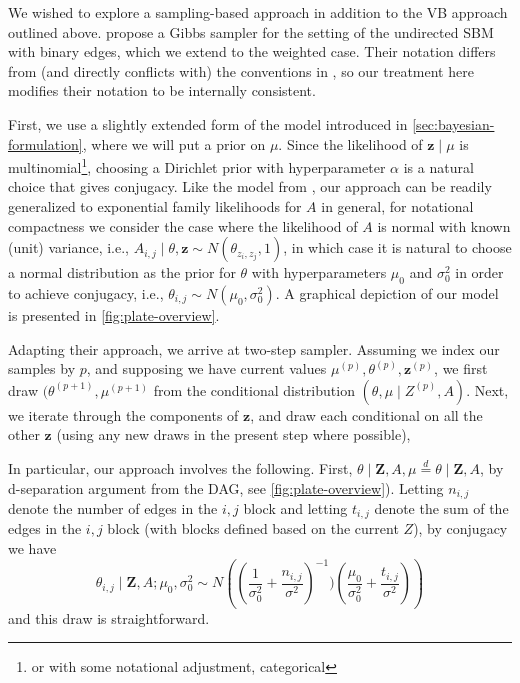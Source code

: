 \documentclass[11pt]{article}   %
\newcommand{\V}[1]{\ensuremath{\boldsymbol{#1}}}
\begin{document}
We wished to explore a sampling-based approach in addition to the VB approach outlined above.
\Textcite{snijders_estimation_1997} propose a Gibbs sampler for the setting of the undirected SBM with binary edges, which we extend to the weighted case.
Their notation differs from (and directly conflicts with) the conventions in \parencite{aicher_adapting_2013,aicher_learning_2015}, so our treatment here modifies their notation to be internally consistent.

First, we use a slightly extended form of the model introduced in \autoref{sec:bayesian-formulation}, where we will put a prior on $\mu$.
Since the likelihood of $\V{z} \mid \mu$ is multinomial\footnote{or with some notational adjustment, categorical}, choosing a Dirichlet prior with hyperparameter $\alpha$ is a natural choice that gives conjugacy.
Like the model from \textcite{aicher_adapting_2013,aicher_learning_2015}, our approach can be readily generalized to exponential family likelihoods for $A$ in general, for notational compactness we consider the case where the likelihood of $A$ is normal with known (unit) variance, i.e., $A_{i,j} \mid \theta, \V{z} \sim N(\theta_{z_i,z_j},1)$, in which case it is natural to choose a normal distribution as the prior for $\theta$ with hyperparameters $\mu_0$ and $\sigma^2_0$ in order to achieve conjugacy, i.e., $\theta_{i,j} \sim N(\mu_0, \sigma_0^2)$.
A graphical depiction of our model is presented in \autoref{fig:plate-overview}.


Adapting their approach, we arrive at two-step sampler.
Assuming we index our samples by $p$, and supposing we have current values  $\mu^{(p)}, \theta^{(p)}, \V{z}^{(p)}$, we first draw $(\theta^{(p+1)}, \mu^{(p+1)}$ from the conditional distribution $(\theta, \mu \mid Z^{(p)}, A)$.
Next, we iterate through the components of $\V{z}$, and draw each conditional on all the other $\V{z}$ (using any new draws in the present step where possible),

In particular, our approach involves the following.
First, $\theta \mid \V{Z}, A, \mu \overset{d}{=} \theta \mid \V{Z}, A$, by d-separation argument from the DAG, see \autoref{fig:plate-overview}).
Letting $n_{i,j}$ denote the number of edges in the $i,j$ block and letting $t_{i,j}$ denote the sum of the edges in the $i,j$ block (with blocks defined based on the current $Z$), by conjugacy we have
\begin{equation*}
  \theta_{i,j} \mid \V{Z}, A; \mu_0, \sigma_0^2 \sim N \left( \left( \frac{1}{\sigma_0^2} +  \frac{n_{i,j}}{\sigma^2} \right)^{-1} )  \left( \frac{\mu_0}{\sigma_0^2} + \frac{t_{i,j}}{\sigma^2} \right) \right)
\end{equation*}
and this draw is straightforward.
\end{document}
